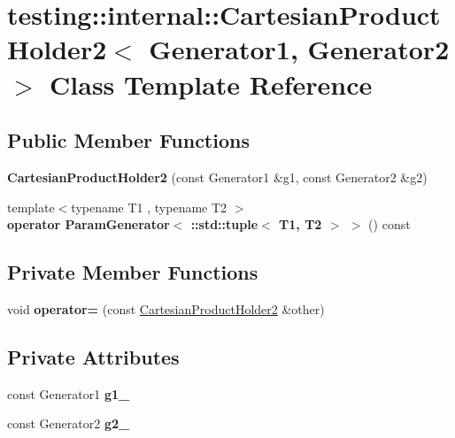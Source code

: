 \hypertarget{classtesting_1_1internal_1_1_cartesian_product_holder2}{}\section{testing\+:\+:internal\+:\+:Cartesian\+Product\+Holder2$<$ Generator1, Generator2 $>$ Class Template Reference}
\label{classtesting_1_1internal_1_1_cartesian_product_holder2}
\subsection*{Public Member Functions}
\begin{DoxyCompactItemize}
\item 
\mbox{\label{classtesting_1_1internal_1_1_cartesian_product_holder2_a504471500c3171f7efee84b830004ff9}} 
{\bfseries Cartesian\+Product\+Holder2} (const Generator1 \&g1, const Generator2 \&g2)
\item 
\mbox{\label{classtesting_1_1internal_1_1_cartesian_product_holder2_afa0052d44ded139ca23a270375d28e6a}} 
{\footnotesize template$<$typename T1 , typename T2 $>$ }\\{\bfseries operator Param\+Generator$<$ \+::std\+::tuple$<$ T1, T2 $>$ $>$} () const
\end{DoxyCompactItemize}
\subsection*{Private Member Functions}
\begin{DoxyCompactItemize}
\item 
\mbox{\label{classtesting_1_1internal_1_1_cartesian_product_holder2_a52e0f5a32ce4c6d7d1d919a23e2f6909}} 
void {\bfseries operator=} (const \mbox{\hyperlink{classtesting_1_1internal_1_1_cartesian_product_holder2}{Cartesian\+Product\+Holder2}} \&other)
\end{DoxyCompactItemize}
\subsection*{Private Attributes}
\begin{DoxyCompactItemize}
\item 
\mbox{\label{classtesting_1_1internal_1_1_cartesian_product_holder2_add056f2b57886fb012c31613f2634885}} 
const Generator1 {\bfseries g1\+\_\+}
\item 
\mbox{\label{classtesting_1_1internal_1_1_cartesian_product_holder2_ad3b3deed8d472cd491e72b8406466177}} 
const Generator2 {\bfseries g2\+\_\+}
\end{DoxyCompactItemize}


